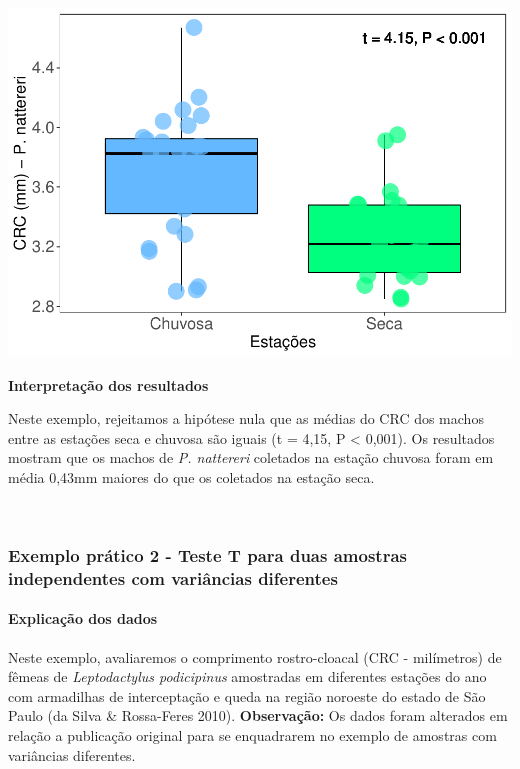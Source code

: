 \documentclass[
]{book}
\begin{document}
\includegraphics{livro_r_ecologia_files/figure-latex/unnamed-chunk-2-1.pdf}

\textbf{Interpretação dos resultados}

Neste exemplo, rejeitamos a hipótese nula que as médias do CRC dos machos entre as estações seca e chuvosa são iguais (t = 4,15, P \textless{} 0,001). Os resultados mostram que os machos de \emph{P. nattereri} coletados na estação chuvosa foram em média 0,43mm maiores do que os coletados na estação seca.

~

\hypertarget{exemplo-pruxe1tico-2---teste-t-para-duas-amostras-independentes-com-variuxe2ncias-diferentes}{%
\subsubsection{Exemplo prático 2 - Teste T para duas amostras independentes com variâncias diferentes}\label{exemplo-pruxe1tico-2---teste-t-para-duas-amostras-independentes-com-variuxe2ncias-diferentes}}

\hypertarget{explicauxe7uxe3o-dos-dados-1}{%
\paragraph{Explicação dos dados}\label{explicauxe7uxe3o-dos-dados-1}}

Neste exemplo, avaliaremos o comprimento rostro-cloacal (CRC - milímetros) de fêmeas de \emph{Leptodactylus podicipinus} amostradas em diferentes estações do ano com armadilhas de interceptação e queda na região noroeste do estado de São Paulo (da Silva \& Rossa-Feres 2010). \textbf{Observação:} Os dados foram alterados em relação a publicação original para se enquadrarem no exemplo de amostras com variâncias diferentes.
\end{document}
